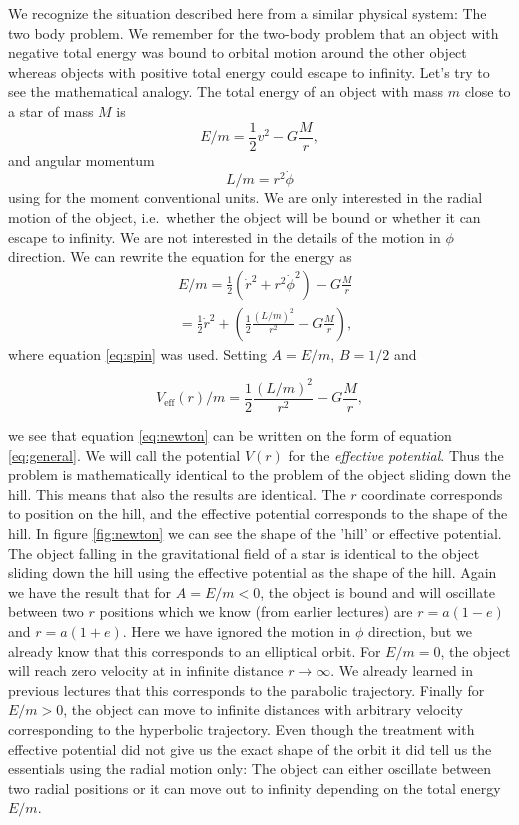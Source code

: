 {\begin{multicols}{2}
We recognize the situation described here from a similar physical system: The two body problem. We remember for the two-body problem that an object with negative total energy was bound to orbital motion around the other object whereas objects with positive total energy could escape to infinity. Let's try to see the mathematical analogy. The total energy of an object with mass $m$ close to a star of mass $M$ is
\[
E/m=\frac{1}{2}v^2-G\frac{M}{r},
\] 
and angular momentum
\begin{equation}
\label{eq:spin}
L/m=r^2\dot{\phi}
\end{equation}
using for the moment conventional units. We are only interested in the radial motion of the object, i.e.\ whether the object will be bound or whether it can escape to infinity. We are not interested in the details of the motion in $\phi$ direction. We can rewrite the equation for the energy as
\begin{align}
\label{eq:newton}
&E/m=\frac{1}{2}(\dot{r}^2+r^2\dot{\phi}^2)-G\frac{M}{r}\nonumber\\
&=\frac{1}{2}\dot{r}^2+\left(\frac{1}{2}\frac{(L/m)^2}{r^2}-G\frac{M}{r}\right),
\end{align}
where equation \ref{eq:spin} was used. Setting $A=E/m$, $B=1/2$ and
\begin{formbox}
\[
V_\mathrm{eff}(r)/m=\frac{1}{2}\frac{(L/m)^2}{r^2}-G\frac{M}{r},
\]
\end{formbox}
we see that equation \ref{eq:newton} can be written on the form of equation \ref{eq:general}. We will call the potential $V(r)$ for the {\it effective potential}. Thus the problem is mathematically identical to the problem of the object sliding down the hill. This means that also the results are identical. The $r$ coordinate corresponds to position on the hill, and the effective potential corresponds to the shape of the hill. In figure \ref{fig:newton} we can see the shape of the 'hill' or effective potential. The object falling in the gravitational field of a star is identical to the object sliding down the hill using the effective potential as the shape of the hill. Again we have the result that for $A=E/m<0$, the object is bound and will oscillate between two $r$ positions which we know (from earlier lectures) are $r=a(1-e)$ and $r=a(1+e)$. Here we have ignored the motion in $\phi$ direction, but we already know that this corresponds to an elliptical orbit. For $E/m=0$, the object will reach zero velocity at in infinite distance $r\rightarrow\infty$. We already learned in previous lectures that this corresponds to the parabolic trajectory. Finally for $E/m>0$, the object can move to infinite distances with arbitrary velocity corresponding to the hyperbolic trajectory. Even though the treatment with effective potential did not give us the exact shape of the orbit it did tell us the essentials using the radial motion only: The object can either oscillate between two radial positions or it can move out to infinity depending on the total energy $E/m$.



\end{multicols}}
